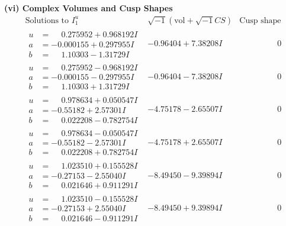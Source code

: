 \documentclass[1p]{elsarticle_modified}
\theoremstyle{definition}
\newcommand{\I}{\sqrt{-1}}
\begin{document}
\newpage\flushleft \textbf{(vi) Complex Volumes and Cusp Shapes}
$$\begin{array}{c|c|c}  
\text{Solutions to }I^u_{1}& \I (\text{vol} + \sqrt{-1}CS) & \text{Cusp shape}\\
 \hline 
\begin{aligned}
u &= \phantom{-}0.275952 + 0.968192 I \\
a &= -0.000155 + 0.297955 I \\
b &= \phantom{-}1.10303 - 1.31729 I\end{aligned}
 & -0.96404 + 7.38208 I & \phantom{-0.000000 } 0 \\ \hline\begin{aligned}
u &= \phantom{-}0.275952 - 0.968192 I \\
a &= -0.000155 - 0.297955 I \\
b &= \phantom{-}1.10303 + 1.31729 I\end{aligned}
 & -0.96404 - 7.38208 I & \phantom{-0.000000 } 0 \\ \hline\begin{aligned}
u &= \phantom{-}0.978634 + 0.050547 I \\
a &= -0.55182 + 2.57301 I \\
b &= \phantom{-}0.022208 - 0.782754 I\end{aligned}
 & -4.75178 - 2.65507 I & \phantom{-0.000000 } 0 \\ \hline\begin{aligned}
u &= \phantom{-}0.978634 - 0.050547 I \\
a &= -0.55182 - 2.57301 I \\
b &= \phantom{-}0.022208 + 0.782754 I\end{aligned}
 & -4.75178 + 2.65507 I & \phantom{-0.000000 } 0 \\ \hline\begin{aligned}
u &= \phantom{-}1.023510 + 0.155528 I \\
a &= -0.27153 - 2.55040 I \\
b &= \phantom{-}0.021646 + 0.911291 I\end{aligned}
 & -8.49450 - 9.39894 I & \phantom{-0.000000 } 0 \\ \hline\begin{aligned}
u &= \phantom{-}1.023510 - 0.155528 I \\
a &= -0.27153 + 2.55040 I \\
b &= \phantom{-}0.021646 - 0.911291 I\end{aligned}
 & -8.49450 + 9.39894 I & \phantom{-0.000000 } 0 \\ \hline\begin{aligned}

\end{aligned}
\end{array}$$
\end{document}
